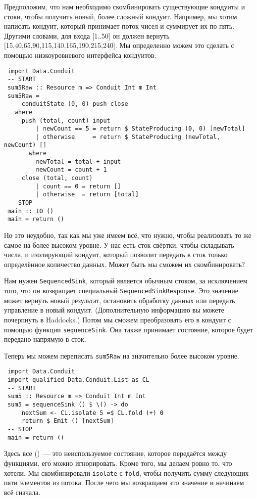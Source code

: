 {Предположим, что нам необходимо скомбинировать существующие кондуиты  и  стоки, 
чтобы получить новый, более сложный кондуит. Например, мы хотим написать кондуит, 
который принимает поток чисел и суммирует их по пять. Другими словами, для входа 
[1..50] он должен вернуть [15,40,65,90,115,140,165,190,215,240]. Мы определенно 
можем это сделать с помощью низкоуровневого интерфейса кондуитов.
\begin{lstlisting}
 import Data.Conduit
 -- START
 sum5Raw :: Resource m => Conduit Int m Int
 sum5Raw =
     conduitState (0, 0) push close
   where
     push (total, count) input
         | newCount == 5 = return $ StateProducing (0, 0) [newTotal]
         | otherwise     = return $ StateProducing (newTotal, newCount) []
       where
         newTotal = total + input
         newCount = count + 1
     close (total, count)
         | count == 0 = return []
         | otherwise  = return [total]
 -- STOP
 main :: IO ()
 main = return ()
\end{lstlisting}
Но это неудобно, так как мы уже имеем всё, что нужно, чтобы реализовать то же самое 
на более высоком уровне. У нас есть сток свёртки, чтобы складывать числа, и изолирующий 
кондуит, который позволит передать в сток только определённое количество данных. 
Может быть мы сможем их скомбинировать?
 
Нам нужен \lstinline'SequencedSink', который является обычным стоком, за исключением 
того, что он возвращает специальный \lstinline'SequencedSinkResponse'. Это 
значение может вернуть новый результат, остановить обработку данных или передать 
управление в новый кондуит. (Дополнительную информацию вы можете почерпнуть 
в Haddocks.) Потом мы сможем преобразовать его в кондуит с помощью функции 
\lstinline'sequenceSink'. Она также принимает состояние, которое будет 
передано напрямую в сток.
 
Теперь мы можем переписать \lstinline'sum5Raw' на значительно более высоком уровне.
\begin{lstlisting}
 import Data.Conduit
 import qualified Data.Conduit.List as CL
 -- START
 sum5 :: Resource m => Conduit Int m Int
 sum5 = sequenceSink () $ \() -> do
     nextSum <- CL.isolate 5 =$ CL.fold (+) 0
     return $ Emit () [nextSum]
 -- STOP
 main = return ()
\end{lstlisting}
Здесь все ()~--- это  неиспользуемое состояние, которое передаётся между функциями,
его можно игнорировать.
Кроме того, мы делаем ровно то, что хотели. Мы скомбинировали 
\lstinline{isolate} с \lstinline{fold}, чтобы получить сумму следующих пяти
элементов из потока. После чего мы возвращаем это значение и начинаем всё сначала.
 
}
